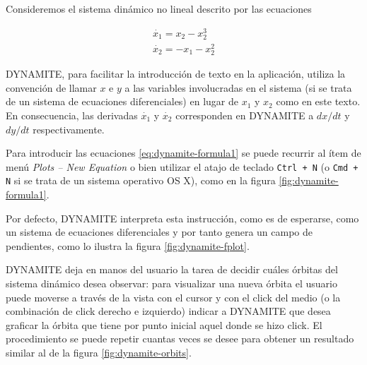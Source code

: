 \begin{example}
Consideremos el sistema dinámico no lineal descrito por las ecuaciones

\begin{equation} \label{eq:dynamite-formula1}
	\begin{array}{ll}
		\dot{x_1} = x_2 - x_2^3 \\
		\dot{x_2} = -x_1 - x_2^2
	\end{array}
\end{equation}

DYNAMITE, para facilitar la introducción de texto en la aplicación, utiliza la convención de llamar $x$ e $y$ a las variables involucradas en el sistema (si se trata de un sistema de ecuaciones diferenciales) en lugar de $x_1$ y $x_2$ como en este texto. En consecuencia, las derivadas $\dot{x_1}$ y $\dot{x_2}$ corresponden en DYNAMITE a $dx/dt$ y $dy/dt$ respectivamente.

Para introducir las ecuaciones \ref{eq:dynamite-formula1} se puede recurrir al ítem de menú \textit{Plots -- New Equation} o bien utilizar el atajo de teclado \texttt{Ctrl + N} (o \texttt{Cmd + N} si se trata de un sistema operativo OS X), como en la figura \ref{fig:dynamite-formula1}.

Por defecto, DYNAMITE interpreta esta instrucción, como es de esperarse, como un sistema de ecuaciones diferenciales y por tanto genera un campo de pendientes, como lo ilustra la figura \ref{fig:dynamite-fplot}.

DYNAMITE deja en manos del usuario la tarea de decidir cuáles órbitas del sistema dinámico desea observar: para visualizar una nueva órbita el usuario puede moverse a través de la vista con el cursor y con el click del medio (o la combinación de click derecho e izquierdo) indicar a DYNAMITE que desea graficar la órbita que tiene por punto inicial aquel donde se hizo click. El procedimiento se puede repetir cuantas veces se desee para obtener un resultado similar al de la figura \ref{fig:dynamite-orbits}. 
\end{example}

